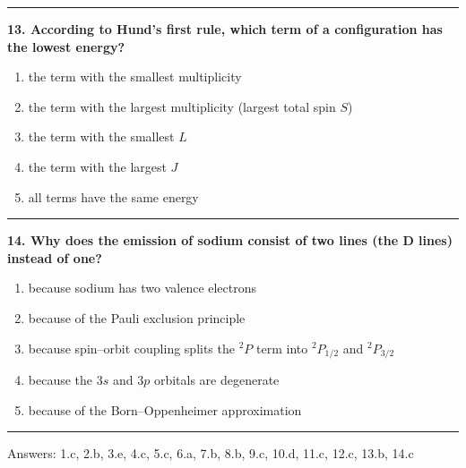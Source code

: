 \documentclass[
  english,
  9pt,
]{extbook}
\providecommand{\tightlist}{%
  \setlength{\itemsep}{0pt}\setlength{\parskip}{0pt}}
\theoremstyle{definition}
\theoremstyle{definition}
\theoremstyle{definition}
\theoremstyle{definition}
\theoremstyle{remark}
\begin{document}
\begin{center}\rule{0.5\linewidth}{0.5pt}\end{center}

\textbf{13. According to Hund's first rule, which term of a configuration has the lowest energy?}

\begin{enumerate}
\def\labelenumi{\alph{enumi}.}
\tightlist
\item
  the term with the smallest multiplicity\\
\item
  the term with the largest multiplicity (largest total spin \(S\))\\
\item
  the term with the smallest \(L\)\\
\item
  the term with the largest \(J\)\\
\item
  all terms have the same energy
\end{enumerate}

\begin{center}\rule{0.5\linewidth}{0.5pt}\end{center}

\textbf{14. Why does the emission of sodium consist of two lines (the D lines) instead of one?}

\begin{enumerate}
\def\labelenumi{\alph{enumi}.}
\tightlist
\item
  because sodium has two valence electrons\\
\item
  because of the Pauli exclusion principle\\
\item
  because spin--orbit coupling splits the \(^2P\) term into \(^2P_{1/2}\) and \(^2P_{3/2}\)\\
\item
  because the \(3s\) and \(3p\) orbitals are degenerate\\
\item
  because of the Born--Oppenheimer approximation
\end{enumerate}

\begin{center}\rule{0.5\linewidth}{0.5pt}\end{center}

Answers: 1.c, 2.b, 3.e, 4.c, 5.c, 6.a, 7.b, 8.b, 9.c, 10.d, 11.c, 12.c, 13.b, 14.c
\end{document}
